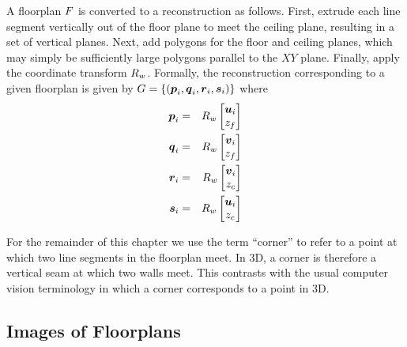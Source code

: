 A floorplan $\Floorplan$ is converted to a reconstruction as
follows. First, extrude each line segment vertically out of the floor
plane to meet the ceiling plane, resulting in a set of vertical
planes. Next, add polygons for the floor and ceiling planes, which may
simply be sufficiently large polygons parallel to the $XY$
plane. Finally, apply the coordinate transform $\SceneR$. Formally,
the reconstruction corresponding to a given floorplan is given by
$\Reconstruction = \{ ( \vect{p}_i, \vect{q}_i, \vect{r}_i, \vect{s}_i
) \}$ where
\begin{eqnarray}
  \vect{p}_i &=& \SceneR \begin{bmatrix} \startpt_i \\ \zfloor \end{bmatrix} \\
  \vect{q}_i &=& \SceneR \begin{bmatrix} \enpt_i \\ \zfloor \end{bmatrix} \\
  \vect{r}_i &=& \SceneR \begin{bmatrix} \enpt_i \\ \zceil \end{bmatrix} \\
  \vect{s}_i &=& \SceneR \begin{bmatrix} \startpt_i \\ \zceil \end{bmatrix}
\end{eqnarray}

For the remainder of this chapter we use the term ``corner'' to refer
to a point at which two line segments in the floorplan meet. In 3D, a
corner is therefore a vertical seam at which two walls meet. This
contrasts with the usual computer vision terminology in which a corner
corresponds to a point in 3D.

\subsection{Images of Floorplans}

\newcommand\worldpt{\vect{v}}
\newcommand\otherworldpt{\vect{u}}
\newcommand\imagept{\vect{p}}
\newcommand\otherimagept{\vect{q}}

